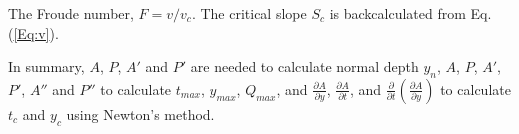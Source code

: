 \noindent The Froude number, $F = v/v_c$. The critical slope $S_c$ is backcalculated from Eq. (\ref{Eq:v}).

\noindent In summary, $A$, $P$, $A'$ and $ P'$ are needed to calculate normal depth $y_n$, $A$, $P$, $A'$, $ P'$, $A''$ and $P''$ to calculate $t_{max}$, $y_{max}$, $Q_{max}$, and  $\frac{\partial A}{\partial y}$,  $\frac{\partial A}{\partial t}$, and $\frac{\partial}{\partial t} \left(\frac{\partial A}{\partial y}\right)$ to calculate $t_c$ and $y_c$ using Newton's method.











